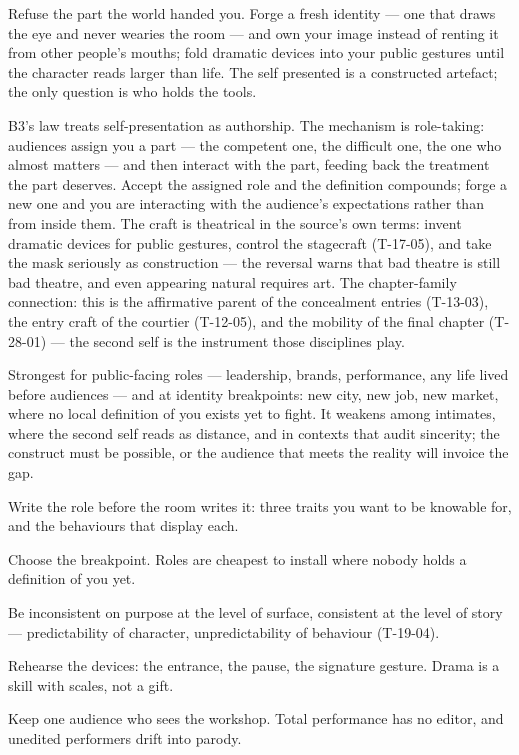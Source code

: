 \begin{core}
Refuse the part the world handed you. Forge a fresh identity --- one that draws the eye and never wearies the room --- and own your image instead of renting it from other people's mouths; fold dramatic devices into your public gestures until the character reads larger than life. The self presented is a constructed artefact; the only question is who holds the tools.
\end{core}
\begin{mechanism}
B3's law treats self-presentation as authorship. The mechanism is role-taking: audiences assign you a part --- the competent one, the difficult one, the one who almost matters --- and then interact with the part, feeding back the treatment the part deserves. Accept the assigned role and the definition compounds; forge a new one and you are interacting with the audience's expectations rather than from inside them. The craft is theatrical in the source's own terms: invent dramatic devices for public gestures, control the stagecraft (T-17-05), and take the mask seriously as construction --- the reversal warns that bad theatre is still bad theatre, and even appearing natural requires art. The chapter-family connection: this is the affirmative parent of the concealment entries (T-13-03), the entry craft of the courtier (T-12-05), and the mobility of the final chapter (T-28-01) --- the second self is the instrument those disciplines play.
\end{mechanism}
\begin{conditions}
Strongest for public-facing roles --- leadership, brands, performance, any life lived before audiences --- and at identity breakpoints: new city, new job, new market, where no local definition of you exists yet to fight. It weakens among intimates, where the second self reads as distance, and in contexts that audit sincerity; the construct must be possible, or the audience that meets the reality will invoice the gap.
\end{conditions}
\begin{application}
  \item Write the role before the room writes it: three traits you want to be knowable for, and the behaviours that display each.
  \item Choose the breakpoint. Roles are cheapest to install where nobody holds a definition of you yet.
  \item Be inconsistent on purpose at the level of surface, consistent at the level of story --- predictability of character, unpredictability of behaviour (T-19-04).
  \item Rehearse the devices: the entrance, the pause, the signature gesture. Drama is a skill with scales, not a gift.
  \item Keep one audience who sees the workshop. Total performance has no editor, and unedited performers drift into parody.
\end{application}
